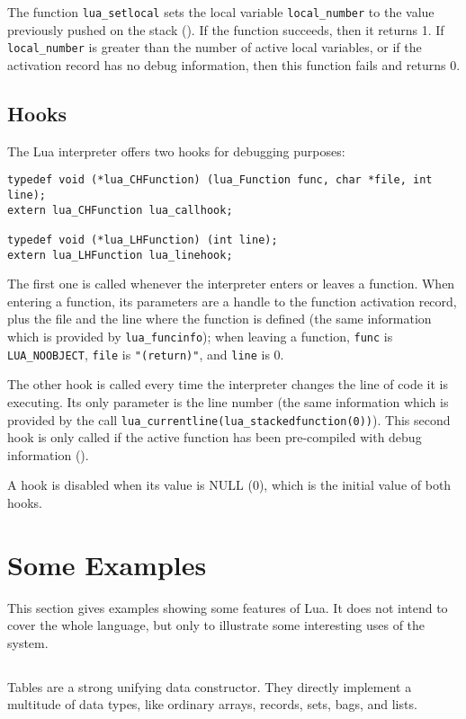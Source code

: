 The function \verb'lua_setlocal' sets the local variable
\verb'local_number' to the value previously pushed on the stack
().
If the function succeeds, then it returns 1.
If \verb'local_number' is greater than the number
of active local variables,
or if the activation record has no debug information,
then this function fails and returns 0.

\subsection{Hooks}

The Lua interpreter offers two hooks for debugging purposes:
\begin{verbatim}
typedef void (*lua_CHFunction) (lua_Function func, char *file, int line);
extern lua_CHFunction lua_callhook;

typedef void (*lua_LHFunction) (int line);
extern lua_LHFunction lua_linehook;
\end{verbatim}
The first one is called whenever the interpreter enters or leaves a
function.
When entering a function,
its parameters are a handle to the function activation record,
plus the file and the line where the function is defined (the same
information which is provided by \verb'lua_funcinfo');
when leaving a function, \verb'func' is \verb'LUA_NOOBJECT',
\verb'file' is \verb'"(return)"', and \verb'line' is 0.

The other hook is called every time the interpreter changes
the line of code it is executing.
Its only parameter is the line number
(the same information which is provided by the call
\verb'lua_currentline(lua_stackedfunction(0))').
This second hook is only called if the active function
has been pre-compiled with debug information ().

A hook is disabled when its value is NULL (0),
which is the initial value of both hooks.


\section{Some Examples}

This section gives examples showing some features of Lua.
It does not intend to cover the whole language,
but only to illustrate some interesting uses of the system.


\subsection{}
Tables are a strong unifying data constructor.
They directly implement a multitude of data types,
like ordinary arrays, records, sets, bags, and lists.

